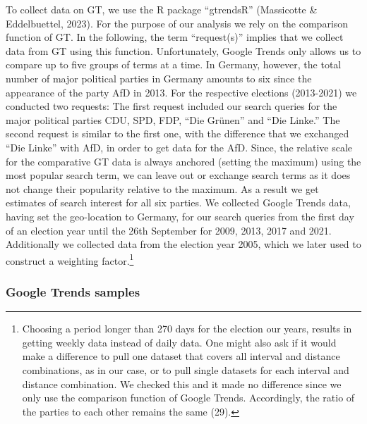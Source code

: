 \documentclass[
  letterpaper,
  DIV=11,
  numbers=noendperiod]{scrartcl}
\begin{document}
To collect data on GT, we use the R package ``gtrendsR'' (Massicotte \&
Eddelbuettel, 2023). For the purpose of our analysis we rely on the
comparison function of GT. In the following, the term ``request(s)''
implies that we collect data from GT using this function. Unfortunately,
Google Trends only allows us to compare up to ﬁve groups of terms at a
time. In Germany, however, the total number of major political parties
in Germany amounts to six since the appearance of the party AfD in 2013.
For the respective elections (2013-2021) we conducted two requests: The
ﬁrst request included our search queries for the major political parties
CDU, SPD, FDP, ``Die Grünen'' and ``Die Linke.'' The second request is
similar to the ﬁrst one, with the diﬀerence that we exchanged ``Die
Linke'' with AfD, in order to get data for the AfD. Since, the relative
scale for the comparative GT data is always anchored (setting the
maximum) using the most popular search term, we can leave out or
exchange search terms as it does not change their popularity relative to
the maximum. As a result we get estimates of search interest for all six
parties. We collected Google Trends data, having set the geo-location to
Germany, for our search queries from the first day of an election year
until the 26th September for 2009, 2013, 2017 and 2021. Additionally we
collected data from the election year 2005, which we later used to
construct a weighting factor.\footnote{Choosing a period longer than 270
  days for the election our years, results in getting weekly data
  instead of daily data. One might also ask if it would make a
  difference to pull one dataset that covers all interval and distance
  combinations, as in our case, or to pull single datasets for each
  interval and distance combination. We checked this and it made no
  difference since we only use the comparison function of Google Trends.
  Accordingly, the ratio of the parties to each other remains the same
  (29).}

\hypertarget{google-trends-samples}{%
\subsubsection{Google Trends samples}\label{google-trends-samples}}
\end{document}
